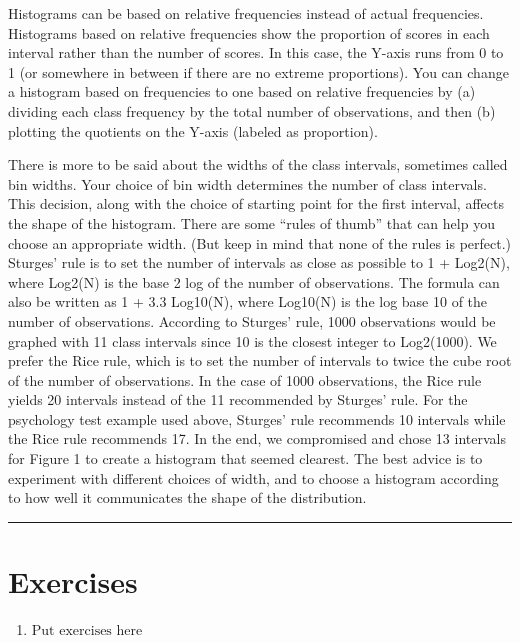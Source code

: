 \documentclass[
]{book}
\providecommand{\tightlist}{%
  \setlength{\itemsep}{0pt}\setlength{\parskip}{0pt}}
\begin{document}
Histograms can be based on relative frequencies instead of actual frequencies. Histograms based on relative frequencies show the proportion of scores in each interval rather than the number of scores. In this case, the Y-axis runs from 0 to 1 (or somewhere in between if there are no extreme proportions). You can change a histogram based on frequencies to one based on relative frequencies by (a) dividing each class frequency by the total number of observations, and then (b) plotting the quotients on the Y-axis (labeled as proportion).

There is more to be said about the widths of the class intervals, sometimes called bin widths. Your choice of bin width determines the number of class intervals. This decision, along with the choice of starting point for the first interval, affects the shape of the histogram. There are some ``rules of thumb'' that can help you choose an appropriate width. (But keep in mind that none of the rules is perfect.) Sturges' rule is to set the number of intervals as close as possible to 1 + Log2(N), where Log2(N) is the base 2 log of the number of observations. The formula can also be written as 1 + 3.3 Log10(N), where Log10(N) is the log base 10 of the number of observations. According to Sturges' rule, 1000 observations would be graphed with 11 class intervals since 10 is the closest integer to Log2(1000). We prefer the Rice rule, which is to set the number of intervals to twice the cube root of the number of observations. In the case of 1000 observations, the Rice rule yields 20 intervals instead of the 11 recommended by Sturges' rule. For the psychology test example used above, Sturges' rule recommends 10 intervals while the Rice rule recommends 17. In the end, we compromised and chose 13 intervals for Figure 1 to create a histogram that seemed clearest. The best advice is to experiment with different choices of width, and to choose a histogram according to how well it communicates the shape of the distribution.

\begin{center}\rule{0.5\linewidth}{0.5pt}\end{center}

\hypertarget{exercises-3}{%
\section{Exercises}\label{exercises-3}}

\begin{enumerate}
\def\labelenumi{\arabic{enumi}.}
\tightlist
\item
  \(\text{Put exercises here}\)
\end{enumerate}

  
\end{document}
